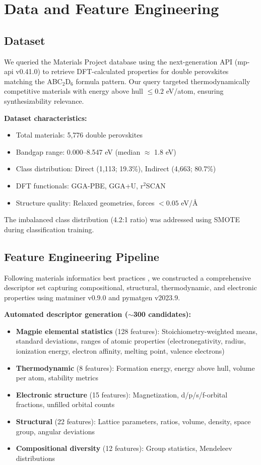 \documentclass[conference]{IEEEtran}
\begin{document}
\section{Data and Feature Engineering}

\subsection{Dataset}
We queried the Materials Project database \cite{Jain2013MP, Ong2015MP} using the next-generation API (mp-api v0.41.0) to retrieve DFT-calculated properties for double perovskites matching the ABC$_2$D$_6$ formula pattern. Our query targeted thermodynamically competitive materials with energy above hull $\leq 0.2$ eV/atom, ensuring synthesizability relevance.

\textbf{Dataset characteristics:}
\begin{itemize}
  \item Total materials: 5,776 double perovskites
  \item Bandgap range: 0.000--8.547 eV (median $\approx$ 1.8 eV)
  \item Class distribution: Direct (1,113; 19.3\%), Indirect (4,663; 80.7\%)
  \item DFT functionals: GGA-PBE, GGA+U, r$^2$SCAN
  \item Structure quality: Relaxed geometries, forces $< 0.05$ eV/\AA
\end{itemize}

The imbalanced class distribution (4.2:1 ratio) was addressed using SMOTE \cite{Chawla2002SMOTE} during classification training.

\subsection{Feature Engineering Pipeline}
Following materials informatics best practices \cite{Ward2018matminer}, we constructed a comprehensive descriptor set capturing compositional, structural, thermodynamic, and electronic properties using matminer v0.9.0 and pymatgen v2023.9.

\textbf{Automated descriptor generation ($\sim$300 candidates):}
\begin{itemize}
  \item \textbf{Magpie elemental statistics} (128 features): Stoichiometry-weighted means, standard deviations, ranges of atomic properties (electronegativity, radius, ionization energy, electron affinity, melting point, valence electrons)
  \item \textbf{Thermodynamic} (8 features): Formation energy, energy above hull, volume per atom, stability metrics
  \item \textbf{Electronic structure} (15 features): Magnetization, d/p/s/f-orbital fractions, unfilled orbital counts
  \item \textbf{Structural} (22 features): Lattice parameters, ratios, volume, density, space group, angular deviations
  \item \textbf{Compositional diversity} (12 features): Group statistics, Mendeleev distributions
\end{itemize}
\end{document}
